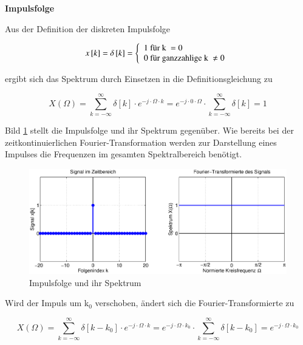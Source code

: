 \clearpage
{\selectfont
\noindent\textbf{Impulsfolge}}\smallskip

\noindent Aus der Definition der diskreten Impulsfolge 

\begin{equation}\label{eq:sevenseventeen}
x\left[k\right]=\delta \left[k\right]=\left\{\begin{array}{l} \text{1 für  k } =\rm 0 \\ \text{0 für ganzzahlige k } \ne 0 \end{array}\right.
\end{equation}

\noindent ergibt sich das Spektrum durch Einsetzen in die Definitionsgleichung zu

\begin{equation}\label{eq:seveneighteen}
X\left(\Omega \right)=\sum _{k=-\infty }^{\infty }\delta \left[k\right]\cdot e^{-j\cdot \Omega \cdot k}  =e^{-j\cdot 0\cdot \Omega } \cdot \sum _{k=-\infty }^{\infty }\delta \left[k\right] =1
\end{equation}

\noindent Bild \ref{fig:FourierImpulsfolge} stellt die Impulsfolge und ihr Spektrum gegen\"{u}ber. Wie bereits bei der zeitkontinuierlichen Fourier-Transformation werden zur Darstellung eines Impulses die Frequenzen im gesamten Spektralbereich ben\"{o}tigt.

\begin{figure}[H]
  \centerline{\includegraphics[width=1\textwidth]{Kapitel7/Bilder/image1.eps}}
  \caption{Impulsfolge und ihr Spektrum}
  \label{fig:FourierImpulsfolge}
\end{figure}

\noindent Wird der Impuls um k${}_{0}$ verschoben, \"{a}ndert sich die Fourier-Transformierte zu

\begin{equation}\label{eq:sevennineteen}
X\left(\Omega \right)=\sum _{k=-\infty }^{\infty }\delta \left[k-k_{0} \right]\cdot e^{-j\cdot \Omega \cdot k}  =e^{-j\cdot \Omega \cdot k_{0} } \cdot \sum _{k=-\infty }^{\infty }\delta \left[k-k_{0} \right] =e^{-j\cdot \Omega \cdot k_{0}}
\end{equation}

